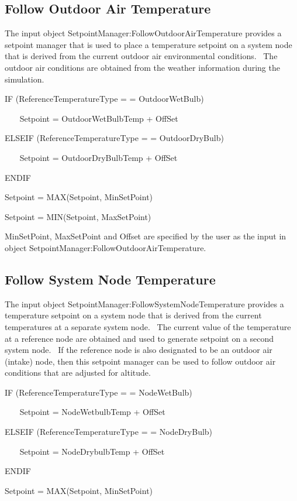 \subsection{Follow Outdoor Air Temperature}\label{follow-outdoor-air-temperature}

The input object SetpointManager:FollowOutdoorAirTemperature provides a setpoint manager that is used to place a temperature setpoint on a system node that is derived from the current outdoor air environmental conditions.~ The outdoor air conditions are obtained from the weather information during the simulation.

IF (ReferenceTemperatureType = = OutdoorWetBulb)

~~~ Setpoint = OutdoorWetBulbTemp + OffSet

ELSEIF (ReferenceTemperatureType = = OutdoorDryBulb)

~~~ Setpoint = OutdoorDryBulbTemp + OffSet

ENDIF

Setpoint = MAX(Setpoint, MinSetPoint)

Setpoint = MIN(Setpoint, MaxSetPoint)

MinSetPoint, MaxSetPoint and Offset are specified by the user as the input in object SetpointManager:FollowOutdoorAirTemperature.

\subsection{Follow System Node Temperature}\label{follow-system-node-temperature}

The input object SetpointManager:FollowSystemNodeTemperature provides a temperature setpoint on a system node that is derived from the current temperatures at a separate system node.~ The current value of the temperature at a reference node are obtained and used to generate setpoint on a second system node.~ If the reference node is also designated to be an outdoor air (intake) node, then this setpoint manager can be used to follow outdoor air conditions that are adjusted for altitude.

IF (ReferenceTemperatureType = = NodeWetBulb)

~~~ Setpoint = NodeWetbulbTemp + OffSet

ELSEIF (ReferenceTemperatureType = = NodeDryBulb)

~~~ Setpoint = NodeDrybulbTemp + OffSet

ENDIF

Setpoint = MAX(Setpoint, MinSetPoint)

